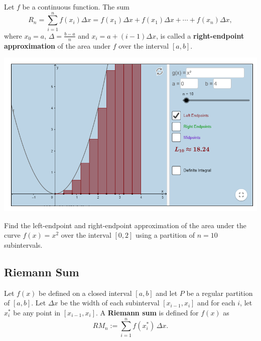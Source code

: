 \begin{definition}

Let \(f\) be a continuous function. The sum
\[R_n=\sum\limits_{i=1}^nf(x_{i})\Delta x=f(x_1)\Delta x+f(x_1)\Delta x+\cdots+f(x_{n})\Delta x,\]
where \(x_0=a\), \(\Delta=\frac{b-a}{n}\) and \(x_i=a+(i-1)\Delta x\),
is called a \textbf{right-endpoint approximation} of the area under
\(f\) over the interval \([a,b]\).

{\centering \includegraphics[scale=0.3]{img/image-20200422234746363.png}
}

\end{definition}

\begin{example}

Find the left-endpoint and right-endpoint approximation of the area
under the curve \(f(x)=x^2\) over the interval \([0, 2]\) using a
partition of \(n=10\) subintervals.

\end{example}
\vspace*{6\baselineskip}

\hypertarget{riemann-sum}{%
\subsection{Riemann Sum}\label{riemann-sum}}

\begin{definition}

Let \(f(x)\) be defined on a closed interval \([a,b]\) and let \(P\) be
a regular partition of \([a,b]\). Let \(\Delta x\) be the width of each
subinterval \([x_{i - 1},x_i]\) and for each \(i\), let \(x^*_i\) be any
point in \([x_{i - 1},x_i]\). A \textbf{Riemann sum} is defined for
\(f(x)\) as \[RM_n:=\sum\limits_{i=1}^nf(x^*_i)\,\Delta x.\]

\end{definition}

